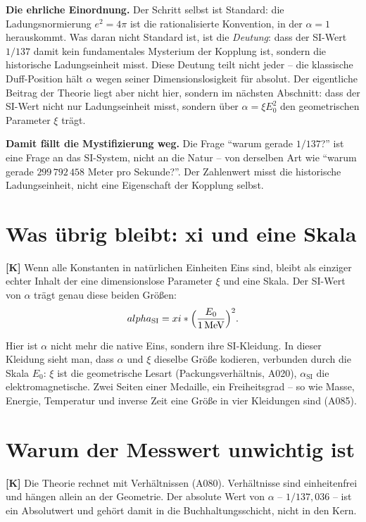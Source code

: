 \textbf{Die ehrliche Einordnung.} Der Schritt selbst ist Standard: die
Ladungsnormierung $e^2 = 4\pi$ ist die rationalisierte Konvention, in der
$\alpha = 1$ herauskommt. Was daran nicht Standard ist, ist die \emph{Deutung}:
dass der SI-Wert $1/137$ damit kein fundamentales Mysterium der Kopplung ist,
sondern die historische Ladungseinheit misst. Diese Deutung teilt nicht jeder --
die klassische Duff-Position hält $\alpha$ wegen seiner Dimensionslosigkeit für
absolut. Der eigentliche Beitrag der Theorie liegt aber nicht hier, sondern im
nächsten Abschnitt: dass der SI-Wert nicht nur Ladungseinheit misst, sondern über
$\alpha = \xi E_0^2$ den geometrischen Parameter $\xi$ trägt.

\textbf{Damit fällt die Mystifizierung weg.} Die Frage \enquote{warum gerade
$1/137$?} ist eine Frage an das SI-System, nicht an die Natur -- von derselben
Art wie \enquote{warum gerade $299\,792\,458$ Meter pro Sekunde?}. Der Zahlenwert
misst die historische Ladungseinheit, nicht eine Eigenschaft der Kopplung
selbst.

\section{Was übrig bleibt: xi und eine Skala}

\textbf{[K]} Wenn alle Konstanten in natürlichen Einheiten Eins sind, bleibt als
einziger echter Inhalt der eine dimensionslose Parameter $\xi$ und eine Skala.
Der SI-Wert von $\alpha$ trägt genau diese beiden Größen:
\[
  \alpha_\text{SI} = \xi\cdot\Bigl(\frac{E_0}{1\,\text{MeV}}\Bigr)^2 .
\]

Hier ist $\alpha$ nicht mehr die native Eins, sondern ihre SI-Kleidung. In dieser
Kleidung sieht man, dass $\alpha$ und $\xi$ dieselbe Größe kodieren, verbunden
durch die Skala $E_0$: $\xi$ ist die geometrische Lesart (Packungsverhältnis,
A020), $\alpha_\text{SI}$ die elektromagnetische. Zwei Seiten einer Medaille,
ein Freiheitsgrad -- so wie Masse, Energie, Temperatur und inverse Zeit eine
Größe in vier Kleidungen sind (A085).

\section{Warum der Messwert unwichtig ist}

\textbf{[K]} Die Theorie rechnet mit Verhältnissen (A080). Verhältnisse sind
einheitenfrei und hängen allein an der Geometrie. Der absolute Wert von $\alpha$
-- $1/137{,}036$ -- ist ein Absolutwert und gehört damit in die
Buchhaltungsschicht, nicht in den Kern.

